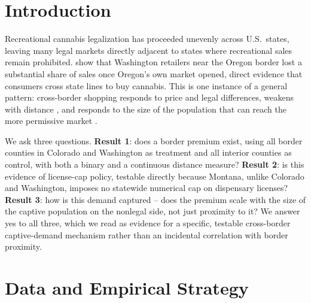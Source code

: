 \documentclass[5p]{elsarticle}
\begin{document}
\section{Introduction}

Recreational cannabis legalization has proceeded unevenly across U.S.\ states, leaving many legal markets
directly adjacent to states where recreational sales remain prohibited. \citet{HansenMillerWeber2020} show
that Washington retailers near the Oregon border lost a substantial share of sales once Oregon's own market
opened, direct evidence that consumers cross state lines to buy cannabis. This is one instance of a general
pattern: cross-border shopping responds to price and legal differences, weakens with distance
\citep{AsplundFribergWilander2007,Lovenheim2008,BeattyLarsenSommervoll2009,ChandraHeadTappata2014}, and
responds to the size of the population that can reach the more permissive market
\citep{KnightSchiff2012,Agrawal2015}.

We ask three questions. \textbf{Result 1}: does a border premium exist, using all border counties in
Colorado and Washington as treatment and all interior counties as control, with both a binary and a
continuous distance measure? \textbf{Result 2}: is this evidence of license-cap policy, testable directly
because Montana, unlike Colorado and Washington, imposes no statewide numerical cap on dispensary licenses?
\textbf{Result 3}: how is this demand captured -- does the premium scale with the size of the captive
population on the nonlegal side, not just proximity to it? We answer yes to all three, which we read as
evidence for a specific, testable cross-border captive-demand mechanism rather than an incidental
correlation with border proximity.

\section{Data and Empirical Strategy}
\end{document}
